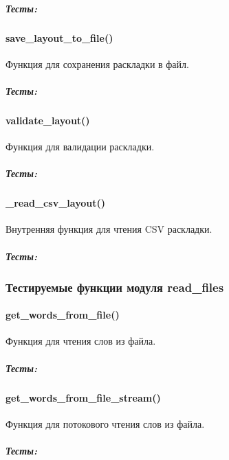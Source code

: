 \documentclass[a4paper,11pt,russian,openany,oneside]{sphinxmanual}
\begin{document}
\subparagraph{Тесты:}
\label{\detokenize{tests_module:id31}}

\paragraph{save\_layout\_to\_file()}
\label{\detokenize{tests_module:save-layout-to-file}}
\sphinxAtStartPar
Функция для сохранения раскладки в файл.


\subparagraph{Тесты:}
\label{\detokenize{tests_module:id32}}

\paragraph{validate\_layout()}
\label{\detokenize{tests_module:validate-layout}}
\sphinxAtStartPar
Функция для валидации раскладки.


\subparagraph{Тесты:}
\label{\detokenize{tests_module:id33}}

\paragraph{\_read\_csv\_layout()}
\label{\detokenize{tests_module:read-csv-layout}}
\sphinxAtStartPar
Внутренняя функция для чтения CSV раскладки.


\subparagraph{Тесты:}
\label{\detokenize{tests_module:id34}}

\subsubsection{Тестируемые функции модуля read\_files}
\label{\detokenize{tests_module:read-files}}

\paragraph{get\_words\_from\_file()}
\label{\detokenize{tests_module:get-words-from-file}}
\sphinxAtStartPar
Функция для чтения слов из файла.


\subparagraph{Тесты:}
\label{\detokenize{tests_module:id35}}

\paragraph{get\_words\_from\_file\_stream()}
\label{\detokenize{tests_module:get-words-from-file-stream}}
\sphinxAtStartPar
Функция для потокового чтения слов из файла.


\subparagraph{Тесты:}
\label{\detokenize{tests_module:id36}}
\end{document}
